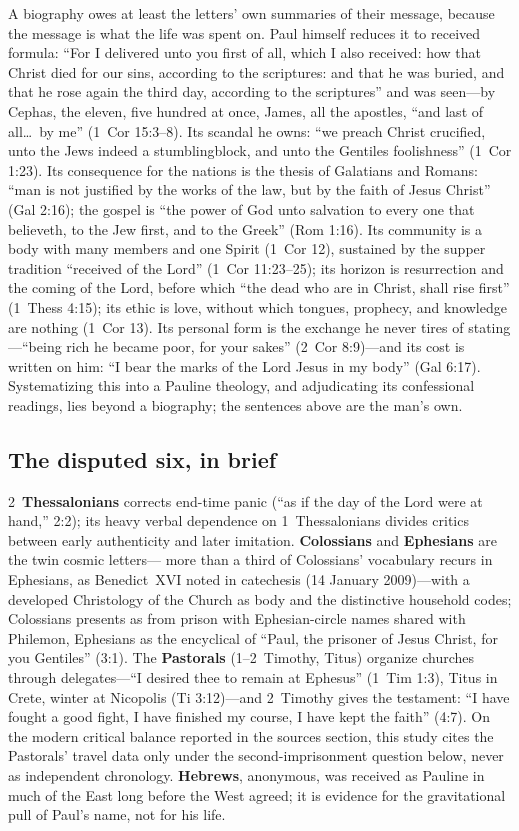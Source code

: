 A biography owes at least the letters' own summaries of their message,
because the message is what the life was spent on. Paul himself reduces
it to received formula: ``For I delivered unto you first of all, which I
also received: how that Christ died for our sins, according to the
scriptures: and that he was buried, and that he rose again the third day,
according to the scriptures'' and was seen---by Cephas, the eleven, five
hundred at once, James, all the apostles, ``and last of all\ldots\ by
me'' (1~Cor 15:3--8). Its scandal he owns: ``we preach Christ crucified,
unto the Jews indeed a stumblingblock, and unto the Gentiles
foolishness'' (1~Cor 1:23). Its consequence for the nations is the thesis
of Galatians and Romans: ``man is not justified by the works of the law,
but by the faith of Jesus Christ'' (Gal 2:16); the gospel is ``the power
of God unto salvation to every one that believeth, to the Jew first, and
to the Greek'' (Rom 1:16). Its community is a body with many members and
one Spirit (1~Cor 12), sustained by the supper tradition ``received of
the Lord'' (1~Cor 11:23--25); its horizon is resurrection and the coming
of the Lord, before which ``the dead who are in Christ, shall rise
first'' (1~Thess 4:15); its ethic is love, without which tongues,
prophecy, and knowledge are nothing (1~Cor 13). Its personal form is the
exchange he never tires of stating---``being rich he became poor, for
your sakes'' (2~Cor 8:9)---and its cost is written on him: ``I bear the
marks of the Lord Jesus in my body'' (Gal 6:17). Systematizing this
into a Pauline theology, and adjudicating its confessional readings,
lies beyond a biography; the sentences above are the man's own.

\subsection{The disputed six, in brief}

2~\textbf{Thessalonians} corrects end-time panic (``as if the day of the
Lord were at hand,'' 2:2); its heavy verbal dependence on 1~Thessalonians
divides critics between early authenticity and later imitation.
\textbf{Colossians} and \textbf{Ephesians} are the twin cosmic letters---
more than a third of Colossians' vocabulary recurs in Ephesians, as
Benedict~XVI noted in catechesis (14 January 2009)---with a developed
Christology of the Church as body and the distinctive household codes;
Colossians presents as from prison with Ephesian-circle names shared with
Philemon, Ephesians as the encyclical of ``Paul, the prisoner of Jesus
Christ, for you Gentiles'' (3:1). The \textbf{Pastorals} (1--2~Timothy,
Titus) organize churches through delegates---``I desired thee to remain at
Ephesus'' (1~Tim 1:3), Titus in Crete, winter at Nicopolis (Ti 3:12)---and
2~Timothy gives the testament: ``I have fought a good fight, I have
finished my course, I have kept the faith'' (4:7). On the modern critical
balance reported in the sources section, this study cites the Pastorals'
travel data only under the second-imprisonment question below, never as
independent chronology. \textbf{Hebrews}, anonymous, was received as
Pauline in much of the East long before the West agreed; it is evidence
for the gravitational pull of Paul's name, not for his life.

